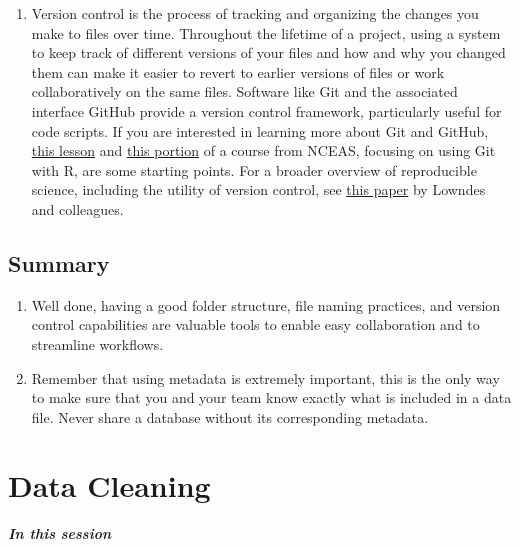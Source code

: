 \documentclass[
]{book}
\providecommand{\tightlist}{%
  \setlength{\itemsep}{0pt}\setlength{\parskip}{0pt}}
\begin{document}
\begin{enumerate}
\def\labelenumi{\arabic{enumi}.}
\tightlist
\item
  Version control is the process of tracking and organizing the changes you make to files over time. Throughout the lifetime of a project, using a system to keep track of different versions of your files and how and why you changed them can make it easier to revert to earlier versions of files or work collaboratively on the same files. Software like Git and the associated interface GitHub provide a version control framework, particularly useful for code scripts. If you are interested in learning more about Git and GitHub, \href{https://nceas.github.io/oss-lessons/version-control/1-git-basics.html}{this lesson} and \href{http://ohi-science.org/data-science-training/github.html}{this portion} of a course from NCEAS, focusing on using Git with R, are some starting points. For a broader overview of reproducible science, including the utility of version control, see \href{https://www.nature.com/articles/s41559-017-0160}{this paper} by Lowndes and colleagues.
\end{enumerate}

\hypertarget{summary}{%
\subsection{Summary}\label{summary}}

\begin{enumerate}
\def\labelenumi{\arabic{enumi}.}
\item
  Well done, having a good folder structure, file naming practices, and version control capabilities are valuable tools to enable easy collaboration and to streamline workflows.
\item
  Remember that using metadata is extremely important, this is the only way to make sure that you and your team know exactly what is included in a data file. Never share a database without its corresponding metadata.
\end{enumerate}

\hypertarget{data-cleaning}{%
\section{Data Cleaning}\label{data-cleaning}}

\textbf{\emph{In this session }}
\end{document}

